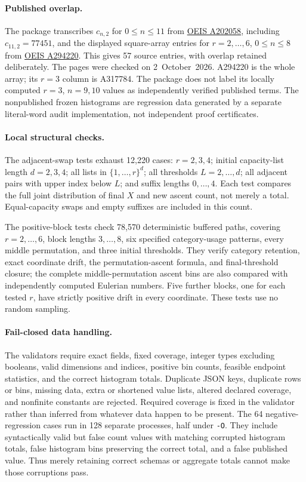 \documentclass[11pt,letterpaper]{article}
\theoremstyle{remark}\newtheorem{remark}[theorem]{Remark}
\begin{document}
\paragraph{Published overlap.}
The package transcribes $c_{n,2}$ for $0\le n\le11$ from
\href{https://oeis.org/A202058}{OEIS A202058}, including $c_{11,2}=77451$,
and the displayed square-array entries for $r=2,\ldots,6$, $0\le n\le8$ from
\href{https://oeis.org/A294220}{OEIS A294220}.  This gives 57 source entries,
with overlap retained deliberately.  The pages were checked on
2~October~2026.  A294220 is the whole array; its $r=3$ column is A317784.
The package does not label its locally computed $r=3$, $n=9,10$ values as
independently verified published terms.  The nonpublished frozen histograms
are regression data generated by a separate literal-word audit implementation,
not independent proof certificates.

\paragraph{Local structural checks.}
The adjacent-swap tests exhaust 12,220 cases: $r=2,3,4$; initial capacity-list
length $d=2,3,4$; all lists in $\{1,\ldots,r\}^d$; all thresholds
$L=2,\ldots,d$; all adjacent pairs with upper index below $L$; and suffix
lengths $0,\ldots,4$.  Each test compares the full joint distribution of final
$X$ and new ascent count, not merely a total.  Equal-capacity swaps and empty
suffixes are included in this count.

The positive-block tests check 78,570 deterministic buffered paths, covering
$r=2,\ldots,6$, block lengths $3,\ldots,8$, six specified category-usage
patterns, every middle permutation, and three initial thresholds.  They verify
category retention, exact coordinate drift, the permutation-ascent formula,
and final-threshold closure; the complete middle-permutation ascent bins are
also compared with independently computed Eulerian numbers.  Five further
blocks, one for each tested $r$, have strictly positive drift in every
coordinate.  These tests use no random sampling.

\paragraph{Fail-closed data handling.}
The validators require exact fields, fixed coverage, integer types excluding
booleans, valid dimensions and indices, positive bin counts, feasible endpoint
statistics, and the correct histogram totals.  Duplicate JSON keys, duplicate
rows or bins, missing data, extra or shortened value lists, altered declared
coverage, and nonfinite constants are rejected.  Required coverage is fixed
in the validator rather than inferred from whatever data happen to be present.
The 64 negative-regression cases run in 128 separate processes, half under
\texttt{-O}.  They include syntactically valid but false count values with
matching corrupted histogram totals, false histogram bins preserving the
correct total, and a false published value.  Thus merely retaining correct
schemas or aggregate totals cannot make those corruptions pass.
\end{document}
